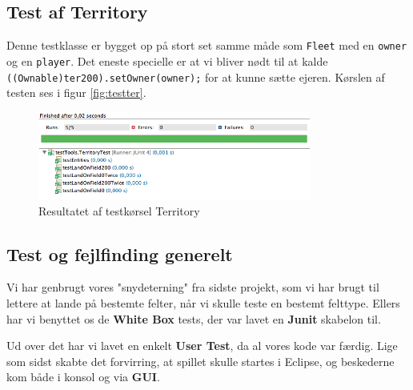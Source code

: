 \subsection{Test af Territory}
Denne testklasse er bygget op på stort set samme måde som \texttt{Fleet} med en \texttt{owner} og en \texttt{player}. Det eneste specielle er at vi bliver nødt til at kalde \texttt{((Ownable)ter200).setOwner(owner);} for at kunne sætte ejeren. Kørslen af testen ses i figur \vref{fig:testter}.
\begin{figure}[!ht]
\centering
\includegraphics[width=0.8\textwidth]{TerTest.jpg}
\caption[<Text for the list of figures>]{Resultatet af testkørsel Territory}
\label{fig:testter} 
\end{figure}
\subsection{Test og fejlfinding generelt}
Vi har genbrugt vores "snydeterning" fra sidste projekt, som vi har brugt til lettere at lande på bestemte felter, når vi skulle teste en bestemt felttype.
Ellers har vi benyttet os de \textbf{White Box} tests, der var lavet en \textbf{Junit} skabelon til.

Ud over det har vi lavet en enkelt \textbf{User Test}, da al vores kode var færdig. Lige som sidst skabte det forvirring, at spillet skulle startes i Eclipse, og beskederne kom både i konsol og via \textbf{GUI}.
